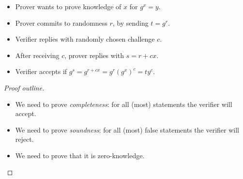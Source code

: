 \begin{frame}
  \begin{definition}
    \begin{itemize}
      \item Prover wants to prove knowledge of \(x\) for \(g^x = y\).

        \pause{}

      \item Prover commits to randomness \(r\), by sending \(t = g^r\).

        \pause{}

      \item Verifier replies with randomly chosen challenge \(c\).

        \pause{}

      \item After receiving \(c\), prover replies with \(s = r + cx\).

        \pause{}

      \item Verifier accepts if \(g^s = g^{r + cx} = g^r (g^x)^c = t y^c\).
    \end{itemize}
  \end{definition}
\end{frame}

\begin{frame}
  \begin{proof}[Proof outline]
    \begin{itemize}
      \item We need to prove \emph{completeness}: for all (most) statements the 
        verifier will accept.

        \pause{}

      \item We need to prove \emph{soundness}: for all (most) false statements 
        the verifier will reject.

        \pause{}

      \item We need to prove that it is zero-knowledge.
    \end{itemize}
  \end{proof}
\end{frame}


